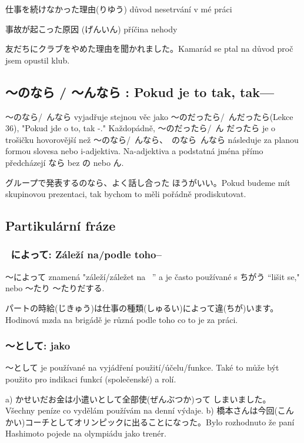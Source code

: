 仕事を続けなかった理由(りゆう) důvod nesetrvání v mé práci




事故が起こった原因 (げんいん) příčina nehody


友だちにクラブをやめた理由を聞かれました。Kamarád se ptal na důvod proč jsem opustil klub.

\subsection{ 〜のなら / 〜んなら : Pokud je to tak,  tak---}

〜のなら/~んなら vyjadřuje stejnou věc jako  〜のだったら/~んだったら(Lekce 36), "Pokud jde o to, tak -." Každopádně, 〜のだったら/~ん だったら je o trošičku hovorovější než  〜のなら/~んなら、~のなら~んなら následuje za planou formou slovesa nebo i-adjektiva. Na-adjektiva a podstatná jména přímo předcházejí なら bez の nebo ん.

グループで発表するのなら、よく話し合った ほうがいい。Pokud budeme mít skupinovou prezentaci, tak bychom to měli pořádně prodiskutovat.

\subsection{Partikulární fráze}
\subsubsection{ ~によって: Záleží na/podle toho--}
〜によって znamená "záleží/záležet na~ ” a je často používané s  ちがう “lišit se," nebo 〜たり
〜たりだする.

パートの時給(じきゅう)は仕事の種類(しゅるい)によって違(ちが)います。Hodinová mzda na brigádě je různá podle toho co to je za práci.


\subsubsection{ 〜として: jako}
〜として je používané na vyjádření použití/účelu/funkce. Také to může být použito pro indikaci funkcí (společenské) a rolí.


a) かせいだお金は小遣いとして全部使(ぜんぶつか)って しまいました。 Všechny peníze co vydělám používám na denní výdaje.
b) 橋本さんは今回(こんかい)コーチとしてオリンピックに出ることになった。Bylo rozhodnuto že paní Hashimoto pojede na olympiádu jako trenér.





































